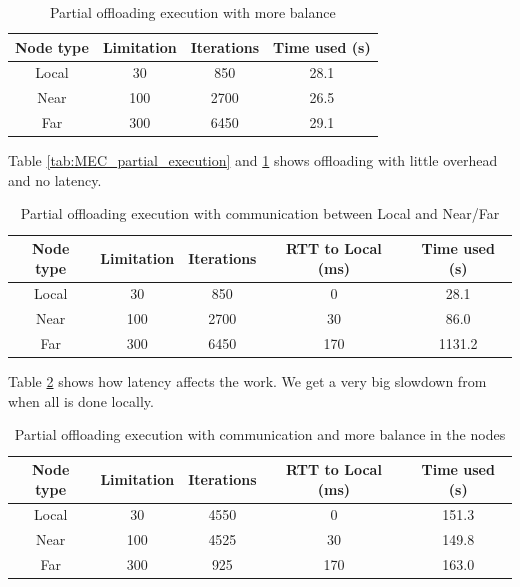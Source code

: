 \begin{table}[h!]
    \centering
    \begin{tabular}[c]{|c|c|c|c|}
        \hline
        Node type & Limitation & Iterations & Time used (s)\\
        \hline
        \hline
        Local & 30 & 850 & 28.1 \\
        \hline
        Near & 100 & 2700 & 26.5 \\
        \hline
        Far & 300 & 6450 & 29.1 \\
        \hline
    \end{tabular}
    \caption{Partial offloading execution with more balance}
    \label{tab:MEC_partial_execution_balanced}
\end{table}
Table \ref{tab:MEC_partial_execution} and \ref{tab:MEC_partial_execution_balanced} shows offloading with little overhead and no latency.






\begin{table}[h!]
    \centering
    \begin{tabular}[c]{|c|c|c|c|c|}
        \hline
        Node type & Limitation & Iterations & RTT to Local (ms)& Time used (s)\\
        \hline
        \hline
        Local & 30 & 850 & 0 & 28.1 \\
        \hline
        Near & 100 & 2700 & 30 & 86.0 \\
        \hline
        Far & 300 & 6450 & 170 & 1131.2 \\
        \hline
    \end{tabular}
    \caption{Partial offloading execution with communication between Local and Near/Far}
    \label{tab:MEC_partial_execution_latency}
\end{table}

Table \ref{tab:MEC_partial_execution_latency} shows how latency affects the work. We get a very big slowdown from when all is done locally. 

\begin{table}[h!]
    \centering
    \begin{tabular}[c]{|c|c|c|c|c|}
        \hline
        Node type & Limitation & Iterations & RTT to Local (ms)& Time used (s)\\
        \hline
        \hline
        Local & 30 & 4550 & 0 & 151.3  \\
        \hline
        Near & 100 & 4525 & 30 & 149.8 \\
        \hline
        Far & 300 & 925 & 170 & 163.0 \\
        \hline
    \end{tabular}
    \caption{Partial offloading execution with communication and more balance in the nodes}
    \label{tab:MEC_partial_execution_latency_balance}
\end{table}






